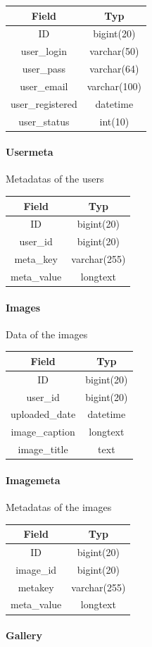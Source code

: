 \documentclass[a4paper,12pt,oneside]{article} %
\begin{document}
\begin{tabular}{|c|c|}
\hline
Field & Typ\tabularnewline
\hline
\hline
ID & bigint(20)\tabularnewline
\hline
user\_login & varchar(50)\tabularnewline
\hline
user\_pass & varchar(64)\tabularnewline
\hline
user\_email & varchar(100)\tabularnewline
\hline
user\_registered & datetime\tabularnewline
\hline
user\_status & int(10)\tabularnewline
\hline
\end{tabular}


\paragraph*{Usermeta}

Metadatas of the users


\begin{tabular}{|c|c|}
\hline
Field & Typ\tabularnewline
\hline
\hline
ID & bigint(20)\tabularnewline
\hline
user\_id & bigint(20)\tabularnewline
\hline
meta\_key & varchar(255)\tabularnewline
\hline
meta\_value & longtext\tabularnewline
\hline
\end{tabular}



\paragraph*{Images}

Data of the images


\begin{tabular}{|c|c|}
\hline
Field & Typ\tabularnewline
\hline
\hline
ID & bigint(20)\tabularnewline
\hline
user\_id & bigint(20)\tabularnewline
\hline
uploaded\_date & datetime\tabularnewline
\hline
image\_caption & longtext\tabularnewline
\hline
image\_title & text\tabularnewline
\end{tabular}


\paragraph*{Imagemeta}

Metadatas of the images


\begin{tabular}{|c|c|}
\hline
Field & Typ\tabularnewline
\hline
\hline
ID & bigint(20)\tabularnewline
\hline
image\_id & bigint(20)\tabularnewline
\hline
metakey & varchar(255)\tabularnewline
\hline
meta\_value & longtext\tabularnewline
\end{tabular}


\paragraph*{Gallery}
\end{document}
